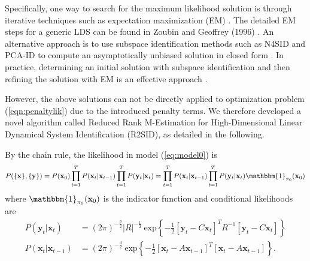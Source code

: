 \documentclass[fleqn]{article}
\let\oldref\ref
\renewcommand{\ref}[1]{(\oldref{#1})}
\newcommand{\T}{T}
\begin{document}
Specifically, one way to search for the maximum likelihood solution is through iterative techniques such as expectation maximization (EM) \cite{shumway1982approach}. The detailed EM steps for a generic LDS can be found in Zoubin and Geoffrey (1996) \cite{ghahramani1996parameter}. An alternative approach is to use subspace identification methods such as N4SID and PCA-ID to compute an asymptotically unbiased solution in closed form \cite{van1994n4sid} \cite{doretto2003dynamic}. In practice, determining an initial solution with subspace identification and then refining the solution with EM is an effective approach \cite{bootslearning}.

However, the above solutions can not be directly applied to optimization problem \ref{eqn:penaltylik} due to the introduced penalty terms. We therefore developed a novel algorithm called Reduced Rank M-Estimation for High-Dimensional Linear Dynamical System Identification (R2SID), as detailed in the following.

By the chain rule, the likelihood in model \ref{eq:model0} is
\begin{equation*}\label{eqn:likelihood}
P(\{\mathbf{x}\},\{\mathbf{y}\})=P(\mathbf{x}_0)\prod\limits_{t=1}^{T}P(\mathbf{x}_t|\mathbf{x}_{t-1})\prod\limits_{t=1}^{T} P(\mathbf{y}_t|\mathbf{x}_t)=\prod\limits_{t=1}^{T}P(\mathbf{x}_t|\mathbf{x}_{t-1})\prod\limits_{t=1}^{T} P(\mathbf{y}_t|\mathbf{x}_t)\mathbbm{1}_{\mathbf{\pi}_0}(\mathbf{x}_0)
\end{equation*}
where $\mathbbm{1}_{\mathbf{\pi}_0}(\mathbf{x}_0)$ is the indicator function and conditional likelihoods are
\begin{equation*}\label{eqn:condlik}
\begin{aligned}
P(\mathbf{y}_t|\mathbf{x}_t)&= (2\pi)^{-\frac{p}{2}}|R|^{-\frac{1}{2}}\  \text{exp}\left\{-\frac{1}{2}[\mathbf{y}_t-C\mathbf{x}_t]^{\T}R^{-1}[\mathbf{y}_t-C\mathbf{x}_t]\right\}\\
P(\mathbf{x}_t|\mathbf{x}_{t-1})
&=(2\pi)^{-\frac{d}{2}}\  \text{exp}\left\{-\frac{1}{2}[\mathbf{x}_t-A\mathbf{x}_{t-1}]^{\T}[\mathbf{x}_t-A\mathbf{x}_{t-1}]\right\}.
\end{aligned}
\end{equation*}
\end{document}
